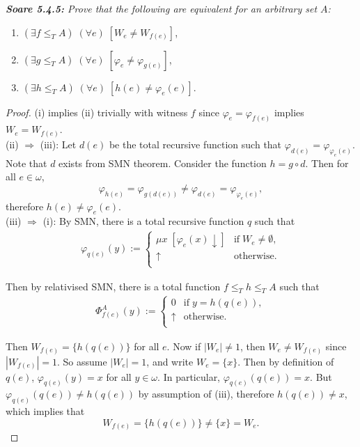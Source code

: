 \documentclass{article}
\begin{document}
\it \textbf{Soare 5.4.5:} Prove that the following are equivalent for an
  arbitrary set $A$:

  \begin{enumerate}[label={(\roman*)}]
    \item $(\exists f\leq_T A)\; (\forall e)\; [W_e\neq W_{f(e)}]$,
    \item $(\exists g\leq_T A)\; (\forall e)\; [\varphi_e\neq
      \varphi_{g(e)}]$,
    \item $(\exists h\leq_T A)\; (\forall e)\; [h(e)\neq \varphi_e(e)]$.
  \end{enumerate}

  \begin{proof}
    (i) implies (ii) trivially with witness $f$ since
    $\varphi_e=\varphi_{f(e)}$ implies $W_e=W_{f(e)}$. \\

    (ii) $\Rightarrow$ (iii): Let $d(e)$ be the total recursive function
    such that $\varphi_{d(e)} =\varphi_{\varphi_e(e)}$. Note that $d$
    exists from SMN theorem. Consider the function $h=g\circ d$. Then for
    all $e\in\omega$,
    \[\varphi_{h(e)} =\varphi_{g(d(e))} \neq\varphi_{d(e)}
    =\varphi_{\varphi_e(e)},\]
    therefore $h(e)\neq\varphi_e(e)$. \\

    (iii) $\Rightarrow$ (i): By SMN, there is a total recursive function
    $q$ such that
    \begin{align*}
      \varphi_{q(e)}(y) :=
      \begin{cases}
        \mu x\; [\varphi_e(x)\downarrow] &\text{if}\; W_e\neq\emptyset,\\
        \uparrow &\text{otherwise}.\\
      \end{cases}
    \end{align*}

    Then by relativised SMN, there is a total function $f\leq_Th\leq_TA$
    such that
    \begin{align*}
      \Phi_{f(e)}^A(y) :=
      \begin{cases}
        0 &\text{if}\; y=h(q(e)),\\
        \uparrow &\text{otherwise}.\\
      \end{cases}
    \end{align*}

    Then $W_{f(e)}=\{h(q(e))\}$ for all $e$. Now if $|W_e|\neq 1$, then
    $W_e\neq W_{f(e)}$ since $|W_{f(e)}|=1$. So assume $|W_e|=1$, and write
    $W_e=\{x\}$. Then by definition of $q(e)$, $\varphi_{q(e)}(y) =x$ for
    all $y\in\omega$. In particular, $\varphi_{q(e)}(q(e)) =x$. But
    $\varphi_{q(e)}(q(e))\neq h(q(e))$ by assumption of (iii), therefore
    $h(q(e))\neq x$, which implies that
    \[W_{f(e)}=\{h(q(e))\}\neq \{x\}=W_e.\]
  \end{proof}
\end{document}
